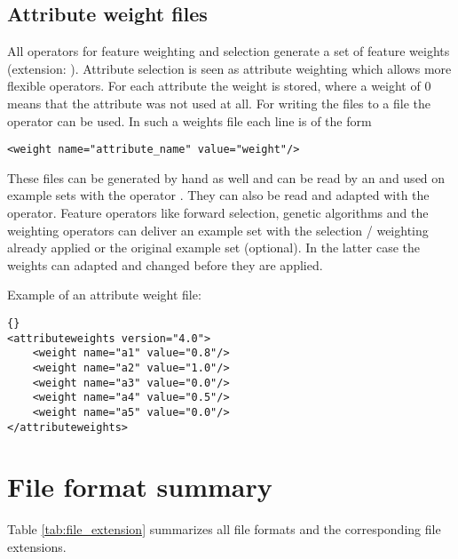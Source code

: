 {\subsection{Attribute weight files}
\label{sec:attribute_weight_files}
All operators for feature weighting and selection generate a set of feature
weights (extension: ). Attribute selection is seen as attribute weighting which allows more
flexible operators. 
For each attribute the weight is stored, where a weight of 0 means
that the attribute was not used at all. For writing the files to a
file the operator  can be used. In such a
weights file each line is of the form
\begin{verbatim}
<weight name="attribute_name" value="weight"/>
\end{verbatim}
These files can be generated by hand as well and can be read by an
 and used on example sets with the operator
. They can also be read and adapted with the
 operator.
Feature operators like forward selection, genetic algorithms and the weighting
operators can deliver an example set with the selection / weighting already
applied or the original example set (optional). In the latter case the weights
can adapted and changed before they are applied.

Example of an attribute weight file:
\begin{lstlisting}[style=rapidminerxmlstyle]{}
<attributeweights version="4.0">
    <weight name="a1" value="0.8"/>
    <weight name="a2" value="1.0"/>
    <weight name="a3" value="0.0"/>
    <weight name="a4" value="0.5"/>
    <weight name="a5" value="0.0"/>
</attributeweights>
\end{lstlisting}


\section{File format summary}

Table \ref{tab:file_extension} summarizes all file formats and the
corresponding file extensions.

}
